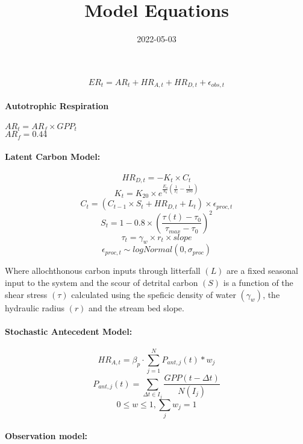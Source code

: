 \documentclass[
]{article}
\title{Model Equations}
\author{}
\date{\vspace{-2.5em}2022-05-03}
\begin{document}
\maketitle

\[ER_t = AR_t + HR_{A,t} + HR_{D,t} + \epsilon_{obs,t}\]

\hypertarget{autotrophic-respiration}{%
\paragraph{Autotrophic Respiration}\label{autotrophic-respiration}}

\(AR_t = AR_f \times GPP_t\)\\
\(AR_f = 0.44\)

\hypertarget{latent-carbon-model}{%
\paragraph{Latent Carbon Model:}\label{latent-carbon-model}}

\[HR_{D,t} = - K_t \times C_t\]
\[K_t = K_{20} \times e ^ {\frac{E_a}{k_b}(\frac{1}{T_t} - \frac{1}{293})}\]
\[C_t = (C_{t-1}\times S_t + HR_{D,t} + L_t) \times \epsilon_{proc,t}\]
\[S_t = 1-0.8 \times \left( \frac{\tau(t) - \tau_0}{\tau_{max} - \tau_0} \right) ^2\]
\[\tau_t = \gamma_w \times r_t \times slope\]
\[\epsilon_{proc,t} \sim logNormal(0, \sigma_{proc})\]

Where allochthonous carbon inputs through litterfall \((L)\) are a fixed
seasonal input to the system and the scour of detrital carbon \((S)\) is
a function of the shear stress \((\tau)\) calculated using the speficic
density of water \((\gamma_w)\), the hydraulic radius \((r)\) and the
stream bed slope.

\hypertarget{stochastic-antecedent-model}{%
\paragraph{Stochastic Antecedent
Model:}\label{stochastic-antecedent-model}}

\[HR_{A,t} = \beta_p \cdot \sum_{j=1}^N P_{ant,j}(t) * w_j\]
\[P_{ant,j}(t) = \sum_{\Delta t \in I_j}\frac{GPP(t-\Delta t)}{N(I_j)}\]
\[0 \leq w \leq 1, \sum_j w_j = 1\]

\hypertarget{observation-model}{%
\paragraph{Observation model:}\label{observation-model}}
\end{document}
